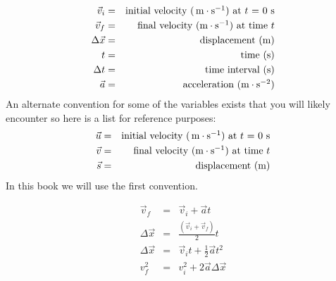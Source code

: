 \begin{eqnarray*}
\vec{v}_i &=& \mbox{initial velocity ($\,\text{m} \cdot \text{s}^{-1}$) at $t$ = 0 s} \\
\vec{v}_f &=& \mbox{final velocity ($\text{m}\cdot\text{s}^{-1}$) at time $t$}\\
\Delta \vec{x} &=& \mbox{displacement (m)} \\
t &=& \mbox{time (s)} \\
\Delta t &=& \mbox{time interval (s)} \\
\vec{a} &=& \mbox{acceleration ($\text{m}\cdot\text{s}^{-2}$)}
\end{eqnarray*}
An alternate convention for some of the variables exists that you will likely encounter so here is a list for reference purposes:
\begin{eqnarray*}
\vec{u} &=& \mbox{initial velocity ($\,\text{m} \cdot \text{s}^{-1}$) at $t$ = 0 s} \\
\vec{v} &=& \mbox{final velocity ($\text{m}\cdot\text{s}^{-1}$) at time $t$}\\
\vec{s} &=& \mbox{displacement (m)} \\
\end{eqnarray*}
In this book we will use the first convention.

\begin{eqnarray}
\vec{v}_f &=& \vec{v}_i + \vec{a}t \label{eq:eq1}\\
\Delta \vec{x} &=& \frac{(\vec{v}_i + \vec{v}_f)}{2} t\label{eq:eq2}\\
\Delta \vec{x} &=& \vec{v}_it + \frac{1}{2}\vec{a}t^2 \label{eq:eq3}\\
v_f^2 &=& v_i^2 + 2\vec{a} \Delta \vec{x} \label{eq:eq4}
\end{eqnarray}


